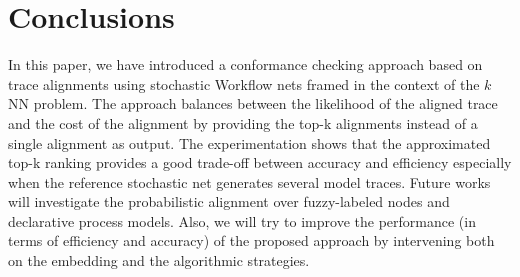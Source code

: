 \section{Conclusions}
\label{sec:conclusion}

In this paper, we have introduced a conformance checking approach based on trace alignments using stochastic Workflow nets framed in the context of the $k$NN problem.
The approach balances between the likelihood of the aligned trace and the cost of the alignment by providing the top-k alignments instead of a single alignment as output. The experimentation shows that the approximated top-k ranking provides a good trade-off between accuracy and efficiency especially when the reference stochastic net generates several model traces.
Future works will investigate the probabilistic alignment over fuzzy-labeled nodes and declarative process models. Also, we will try to improve the performance (in terms of efficiency and accuracy) of the proposed approach by intervening both on the embedding and the algorithmic strategies.


%
%




